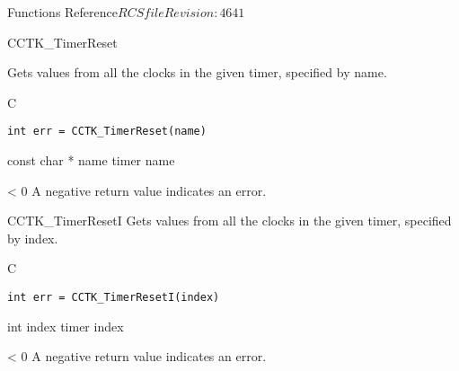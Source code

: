 \begin{cactuspart}{ Functions Reference}{$RCSfile$}{$Revision: 4641 $}
\begin{FunctionDescription}{CCTK\_TimerReset}

\label{CCTK-TimerReset}
Gets values from all the clocks in the
given timer, specified by name.
\begin{SynopsisSection}
\begin{Synopsis}{C}
\begin{verbatim}
int err = CCTK_TimerReset(name)
\end{verbatim}
\end{Synopsis}
\end{SynopsisSection}

\begin{ParameterSection}
\begin{Parameter} {const char * name}
timer name
\end{Parameter}
\end{ParameterSection}

\begin{ErrorSection}
\begin{Error}{< 0}
A negative return value indicates an error.
\end{Error}
\end{ErrorSection}
\end{FunctionDescription}


\begin{FunctionDescription}{CCTK\_TimerResetI}
\label{CCTK-TimerResetI}
Gets values from all the clocks in the
given timer, specified by index.
\begin{SynopsisSection}
\begin{Synopsis}{C}
\begin{verbatim}
int err = CCTK_TimerResetI(index)
\end{verbatim}
\end{Synopsis}
\end{SynopsisSection}

\begin{ParameterSection}
\begin{Parameter} {int index}
timer index
\end{Parameter}
\end{ParameterSection}

\begin{ErrorSection}
\begin{Error}{< 0}
A negative return value indicates an error.
\end{Error}
\end{ErrorSection}
\end{FunctionDescription}



\end{cactuspart}

